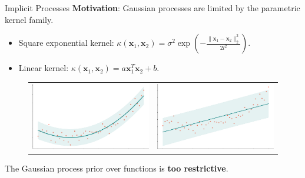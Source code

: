 
    \begin{frame}{Implicit Processes}
        \textbf{\alert{Motivation}}: Gaussian processes are limited by the parametric kernel family.

        \begin{itemize}
            \item Square exponential kernel: \(\kappa(\mathbf x_1, \mathbf x_2) = \sigma^2 \exp \left(- \frac{\|\mathbf x_1 - \mathbf x_2 \|_2^2}{2l^2} \right) \).
            \item Linear kernel: \(\kappa(\mathbf x_1, \mathbf x_2) = a \mathbf x_1^T \mathbf x_2 + b\).
        \end{itemize}

        \begin{figure}
            \centering
            \begin{tabular}{cc}
              \includegraphics[width=.46\linewidth]{imgs/GP_RBF.pdf} &
              \includegraphics[width=.46\linewidth]{imgs/GP_DOT.pdf}
            \end{tabular}
        \end{figure}
        The Gaussian process prior over functions is \textbf{\alert{too restrictive}}.
    \end{frame}

